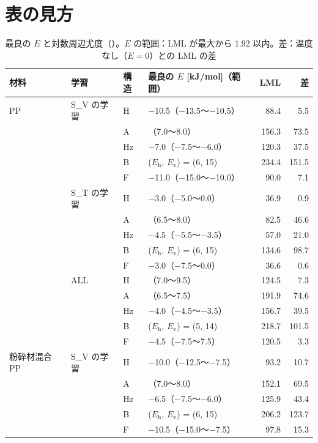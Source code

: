 \documentclass[paper=a4paper,fontsize=10.5pt,line_length=44zw,number_of_lines=38]{jlreq}
\newcommand{\file}[1]{\texttt{\detokenize{#1}}}
\newcommand{\Eh}{E_{\mathrm{h}}}
\newcommand{\Ev}{E_{\mathrm{v}}}
\begin{document}
\section{表の見方}

\begin{table}[H]
\caption{最良の $E$ と対数周辺尤度（\file{best_E.csv}）。$E$ の範囲：LML が最大から 1.92 以内。差：温度なし（$E=0$）との LML の差}\label{tab:best}
\begin{tabularx}{\linewidth}{@{}l>{\raggedright\arraybackslash}p{4.5\zw}l>{\raggedright\arraybackslash}p{9\zw}rr@{}}
\toprule
材料 & 学習 & 構造 & 最良の $E$ [kJ/mol]（範囲） & LML & 差 \\
\midrule
PP & S\_V の学習 & H & $-$10.5（$-$13.5〜$-$10.5） & 88.4 & 5.5 \\
 &  & A & 7.5（7.0〜8.0） & 156.3 & 73.5 \\
 &  & Hz & $-$7.0（$-$7.5〜$-$6.0） & 120.3 & 37.5 \\
 &  & B & ($\Eh$, $\Ev$) = (6, 15) & 234.4 & 151.5 \\
 &  & F & $-$11.0（$-$15.0〜$-$10.0） & 90.0 & 7.1 \\
 & S\_T の学習 & H & $-$3.0（$-$5.0〜0.0） & 36.9 & 0.9 \\
 &  & A & 7.5（6.5〜8.0） & 82.5 & 46.6 \\
 &  & Hz & $-$4.5（$-$5.5〜$-$3.5） & 57.0 & 21.0 \\
 &  & B & ($\Eh$, $\Ev$) = (6, 15) & 134.6 & 98.7 \\
 &  & F & $-$3.0（$-$7.5〜0.0） & 36.6 & 0.6 \\
 & ALL & H & 7.5（7.0〜9.5） & 124.5 & 7.3 \\
 &  & A & 7.0（6.5〜7.5） & 191.9 & 74.6 \\
 &  & Hz & $-$4.0（$-$4.5〜$-$3.5） & 156.7 & 39.5 \\
 &  & B & ($\Eh$, $\Ev$) = (5, 14) & 218.7 & 101.5 \\
 &  & F & $-$4.5（$-$7.5〜7.5） & 120.5 & 3.3 \\
粉砕材混合 PP & S\_V の学習 & H & $-$10.0（$-$12.5〜$-$7.5） & 93.2 & 10.7 \\
 &  & A & 7.5（7.0〜8.0） & 152.1 & 69.5 \\
 &  & Hz & $-$6.5（$-$7.5〜$-$6.0） & 125.9 & 43.4 \\
 &  & B & ($\Eh$, $\Ev$) = (6, 15) & 206.2 & 123.7 \\
 &  & F & $-$10.5（$-$15.0〜$-$7.5） & 97.8 & 15.3 \\

\end{tabularx}
\end{table}
\end{document}
